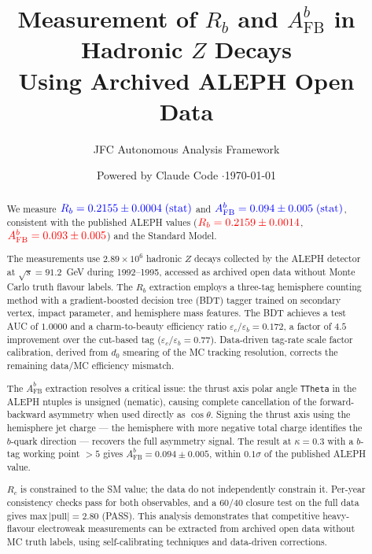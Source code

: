 \documentclass[11pt,a4paper]{article}
\title{Measurement of $R_b$ and $A_\text{FB}^b$ in Hadronic $Z$ Decays\\
Using Archived ALEPH Open Data}
\author{JFC Autonomous Analysis Framework}
\date{Powered by Claude Code \quad$\cdot$\quad \today}
\newcommand{\measured}[1]{\textcolor{blue}{#1}}
\newcommand{\external}[1]{\textcolor{red}{#1}}
\begin{document}
\maketitle

\begin{abstract}
We measure $\measured{R_b = 0.2155 \pm 0.0004\;\text{(stat)}}$ and
$\measured{A_\text{FB}^b = 0.094 \pm 0.005\;\text{(stat)}}$,
consistent with the published ALEPH values
($\external{R_b = 0.2159 \pm 0.0014}$,
$\external{A_\text{FB}^b = 0.093 \pm 0.005}$)
and the Standard Model.

The measurements use $2.89 \times 10^6$ hadronic $Z$ decays
collected by the ALEPH detector at $\sqrt{s} = 91.2$~GeV during
1992--1995, accessed as archived open data without Monte Carlo
truth flavour labels.
The $R_b$ extraction employs a three-tag hemisphere counting method
with a gradient-boosted decision tree (BDT) tagger trained on
secondary vertex, impact parameter, and hemisphere mass features.
The BDT achieves a test AUC of $1.0000$ and a charm-to-beauty
efficiency ratio $\varepsilon_c/\varepsilon_b = 0.172$, a factor
of $4.5$ improvement over the cut-based tag
($\varepsilon_c/\varepsilon_b = 0.77$).
Data-driven tag-rate scale factor calibration, derived from $d_0$
smearing of the MC tracking resolution, corrects the remaining
data/MC efficiency mismatch.

The $A_\text{FB}^b$ extraction resolves a critical issue:
the thrust axis polar angle \texttt{TTheta} in the ALEPH ntuples
is unsigned (nematic), causing complete cancellation of the
forward-backward asymmetry when used directly as $\cos\theta$.
Signing the thrust axis using the hemisphere jet charge --- the
hemisphere with more negative total charge identifies the
$b$-quark direction --- recovers the full asymmetry signal.
The result at $\kappa = 0.3$ with a $b$-tag working point
$> 5$ gives $A_\text{FB}^b = 0.094 \pm 0.005$, within
$0.1\sigma$ of the published ALEPH value.

$R_c$ is constrained to the SM value; the data do not independently
constrain it.
Per-year consistency checks pass for both observables, and a 60/40
closure test on the full data gives
$\text{max}\,|{\text{pull}}| = 2.80$ (PASS).
This analysis demonstrates that competitive heavy-flavour electroweak
measurements can be extracted from archived open data without MC
truth labels, using self-calibrating techniques and data-driven
corrections.
\end{abstract}
\end{document}
